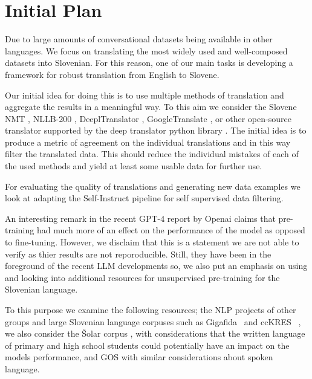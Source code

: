 \documentclass[fleqn,moreauthors,10pt]{ds_report}
\begin{document}
\section*{Initial Plan}
    Due to large amounts of conversational datasets being available in other languages. We focus on translating the most widely used and well-composed datasets into Slovenian. For this reason, one of our main tasks is developing a framework for robust translation from English to Slovene. 
    
    Our initial idea for doing this is to use multiple methods of translation and aggregate the results in a meaningful way. 
    To this aim we consider the Slovene NMT \cite{11356/1736}, NLLB-200 \cite{nllb2022}, DeeplTranslator \cite{deepl}, GoogleTranslate \cite{google-translate}, or other open-source translator supported by the deep translator python library \cite{deep_transaltor}.
    The initial idea is to produce a metric of agreement on the individual translations and in this way filter the translated data.
    This should reduce the individual mistakes of each of the used methods and yield at least some usable data for further use.

    For evaluating the quality of translations and generating new data examples we look at adapting the Self-Instruct \cite{wang2022selfinstruct} pipeline for self supervised data filtering.
    
    An interesting remark in the recent GPT-4 report by Openai claims that pre-training had much more of an effect on the performance of the model as opposed to fine-tuning. However, we disclaim that this is a statement we are not able to verify as thier results are not reporoducible. 
    Still, they have been in the foreground of the recent LLM developments so, we also put an emphasis on using and looking into additional resources for unsupervised pre-training for the Slovenian language. 

    To this purpose we examine the following resources; the NLP projects of other groups and large Slovenian language corpuses such as Gigafida~\cite{11356/1320} and ccKRES~\cite{ccKres} , we also consider the Šolar corpus \cite{kosem2011slovenian}, with considerations that the written language of primary and high school students could potentially have an impact on the models performance, and GOS \cite{Verdonik2013} with similar considerations about spoken language.


\end{document}
